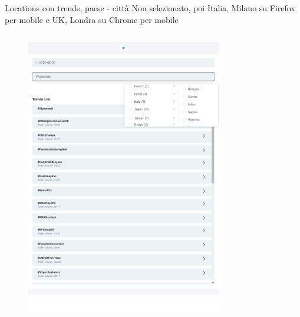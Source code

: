 \documentclass[xcolor=svgnames, aspectratio=169]{beamer}
\begin{document}
\begin{frame}{Locations con trends, paese - città}
    Non selezionato, poi Italia, Milano su Firefox per mobile e UK, Londra su Chrome per mobile
    \begin{columns}[t]
        \vspace*{-12pt}
        \begin{figure}[H]
            \centering
            \includegraphics[width=0.32\paperwidth,height=0.7\paperheight,keepaspectratio]{FrontEnd_TrendrApp_Scelta_Location_Paese_City.pdf}
        \end{figure}
        \vspace*{-12pt}
        \begin{figure}[H]
            \centering

\end{figure}
\end{columns}
\end{frame}
\end{document}
